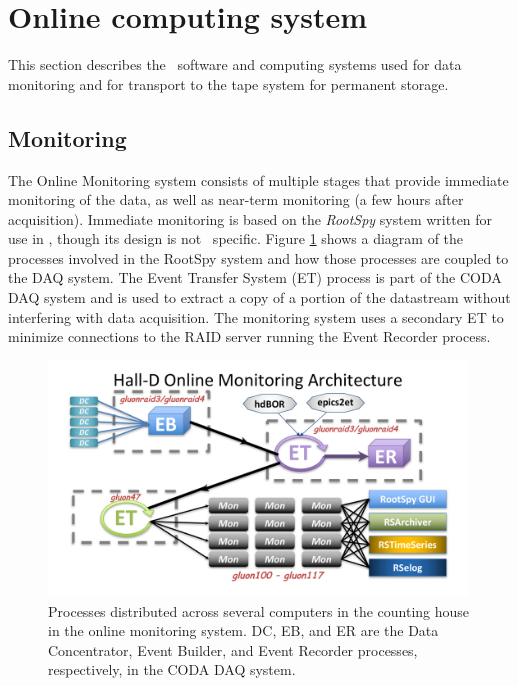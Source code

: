 
\section[Online computing system]{Online computing system \label{sec:online}}

This section describes the \GX ~software and computing systems  used for data monitoring and for transport to the tape system for permanent storage.

\subsection{Monitoring \label{sec:onlinemonitoring}}

The Online Monitoring system consists of multiple stages that provide immediate monitoring of the data, as well as near-term monitoring (a few hours after acquisition). Immediate monitoring is based on the \textit{RootSpy} system\cite{rootspy} written for use in \GX, though its design is not \GX ~specific. Figure \ref{fig:online_monitoring_processes} shows a diagram of the processes involved in the RootSpy system and how those processes are coupled to the DAQ system. The Event Transfer System (ET) process is part of the CODA DAQ system \cite{coda} and is used to extract a copy of a portion of the datastream without interfering with data acquisition. The monitoring system uses a secondary ET to minimize connections to the RAID server running the Event Recorder process.

\begin{figure}[tbp]
\begin{center}
\includegraphics[width=0.99\textwidth, clip,trim=1.5cm 0.9cm 1.7cm 0.8cm]{figures/online_monitoring_processes.pdf}
\caption{\label{fig:online_monitoring_processes}Processes distributed across several computers in the counting house in the online monitoring system. DC, EB, and ER are the Data Concentrator, Event Builder, and Event Recorder processes, respectively, in the CODA DAQ system.}   
\end{center}  
\end{figure}

